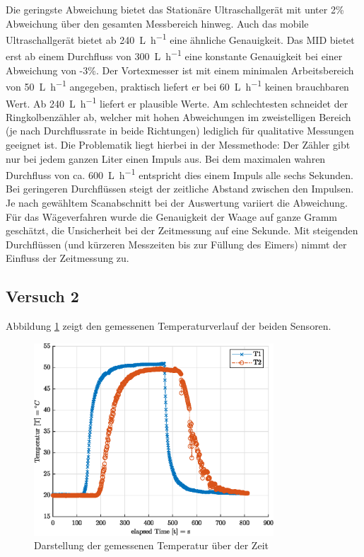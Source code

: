 Die geringste Abweichung bietet das Stationäre Ultraschallgerät mit unter 2\% Abweichung über den gesamten Messbereich hinweg. Auch das mobile Ultraschallgerät bietet ab \SI{240}{\liter\per\hour} eine ähnliche Genauigkeit. Das MID bietet erst ab einem Durchfluss von \SI{300}{\liter\per\hour} eine konstante Genauigkeit bei einer Abweichung von -3\%. Der Vortexmesser ist mit einem minimalen Arbeitsbereich von \SI{50}{\liter\per\hour} angegeben, praktisch liefert er bei \SI{60}{\liter\per\hour} keinen brauchbaren Wert. Ab \SI{240}{\liter\per\hour} liefert er plausible Werte. Am schlechtesten schneidet der Ringkolbenzähler ab, welcher mit hohen Abweichungen im zweistelligen Bereich (je nach Durchflussrate in beide Richtungen) lediglich für qualitative Messungen geeignet ist. Die Problematik liegt hierbei in der Messmethode: Der Zähler gibt nur bei jedem ganzen Liter einen Impuls aus. Bei dem maximalen wahren Durchfluss von ca. \SI{600}{\liter\per\hour} entspricht dies einem Impuls alle sechs Sekunden. Bei geringeren Durchflüssen steigt der zeitliche Abstand zwischen den Impulsen. Je nach gewähltem Scanabschnitt bei der Auswertung variiert die Abweichung.
Für das Wägeverfahren wurde die Genauigkeit der Waage auf ganze Gramm geschätzt, die Unsicherheit bei der Zeitmessung auf eine Sekunde. Mit steigenden Durchflüssen (und kürzeren Messzeiten bis zur Füllung des Eimers) nimmt der Einfluss der Zeitmessung zu.

\subsection{Versuch 2}


Abbildung \ref{fig:temp} zeigt den gemessenen Temperaturverlauf der beiden Sensoren.

\begin{figure}[H]
	\centering
	\includegraphics[width=0.8\textwidth]{../DATA/tempPlot.eps}
	\caption{Darstellung der gemessenen Temperatur über der Zeit}
	\label{fig:temp}
\end{figure}

